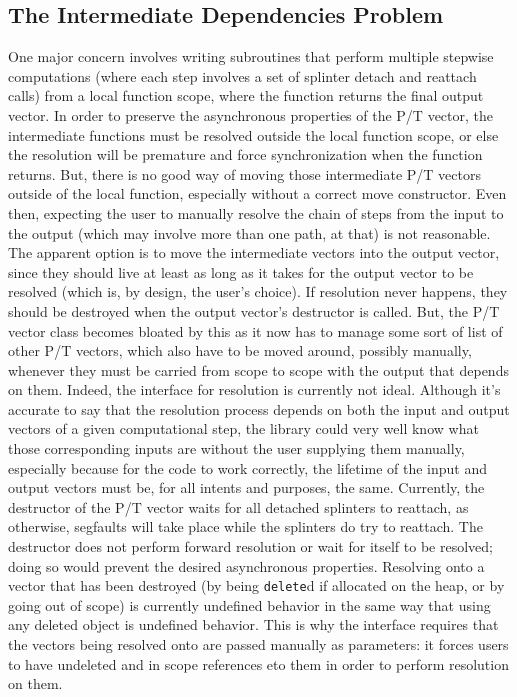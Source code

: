 \subsection{The Intermediate Dependencies Problem}
One major concern involves
writing subroutines that perform multiple stepwise computations (where each step
involves a set of splinter detach and reattach calls) from a local function
scope, where the function returns the final output vector. In order to preserve
the asynchronous properties of the P/T vector, the intermediate functions must
be resolved outside the local function scope, or else the resolution will be
premature and force synchronization when the function returns. But, there is no
good way of moving those intermediate P/T vectors outside of the local function,
especially without a correct move constructor. Even then, expecting the user to
manually resolve the chain of steps from the input to the output (which may
involve more than one path, at that) is not reasonable. The apparent option is
to move the intermediate vectors into the output vector, since they should live
at least as long as it takes for the output vector to be resolved (which is, by
design, the user's choice). If resolution never happens, they should be
destroyed when the output vector's destructor is called. But, the P/T vector
class becomes bloated by this as it now has to manage some sort of list of other
P/T vectors, which also have to be moved around, possibly manually, whenever
they must be carried from scope to scope with the output that depends on them.
Indeed, the interface for resolution is currently not ideal. Although it's
accurate to say that the resolution process depends on both the input and output
vectors of a given computational step, the library could very well know what
those corresponding inputs are without the user supplying them manually,
especially because for the code to work correctly, the lifetime of the input and
output vectors must be, for all intents and purposes, the same. Currently, the
destructor of the P/T vector waits for all detached splinters to reattach, as
otherwise, segfaults will take place while the splinters do try to reattach. The
destructor does not perform forward resolution or wait for itself to be
resolved; doing so would prevent the desired asynchronous properties. Resolving
onto a vector that has been destroyed (by being \texttt{delete}d if allocated on
the heap, or by going out of scope) is currently undefined behavior in the same
way that using any deleted object is undefined behavior. This is why the
interface requires that the vectors being resolved onto are passed manually as
parameters: it forces users to have undeleted and in scope references eto them
in order to perform resolution on them.

